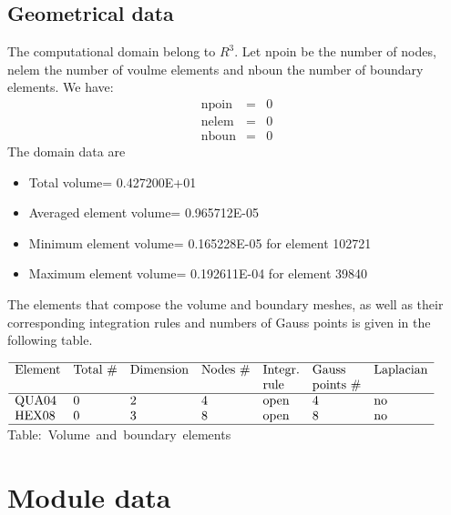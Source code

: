 \documentclass[10pt]{article}
\begin{document}
\subsection{Geometrical data}
The computational domain belong to
$R^3$.
Let npoin be the number of nodes, nelem the number
of voulme elements and nboun the number of boundary elements.
We have:
\begin{eqnarray*}
 \mbox{npoin} &=&        0 \\
 \mbox{nelem} &=&        0 \\
 \mbox{nboun} &=&        0
\end{eqnarray*}
The domain data are
\begin{itemize}
   \item Total volume= 0.427200E+01
   \item Averaged element volume= 0.965712E-05
   \item Minimum element volume= 0.165228E-05
         for element 102721
   \item Maximum element volume= 0.192611E-04
         for element 39840
\end{itemize}
The elements that compose the volume and boundary meshes, as well
as their corresponding integration rules and numbers of Gauss points
is given in the following table.
\begin{center}
\begin{math}
\begin{array}{lllllll}
\hline
\textrm{Element} & \textrm{Total \#}  & \textrm{Dimension} & \textrm{Nodes \#} & 
\textrm{Integr.} & \textrm{Gauss}     & \textrm{Laplacian} \\
\textrm{}        & \textrm{}          & \textrm{}          & \textrm{} & 
\textrm{rule}    & \textrm{points \#} & \textrm{} \\
\hline
\textrm{QUA04} &         0 & 2 &  4 & \textrm{open} &  4 & \textrm{no}\\
\textrm{HEX08} &         0 & 3 &  8 & \textrm{open} &  8 & \textrm{no}\\
\hline
\end{array}
\end{math}
\mbox{Table: Volume and boundary elements}
\end{center}
\section{Module data}
\end{document}
